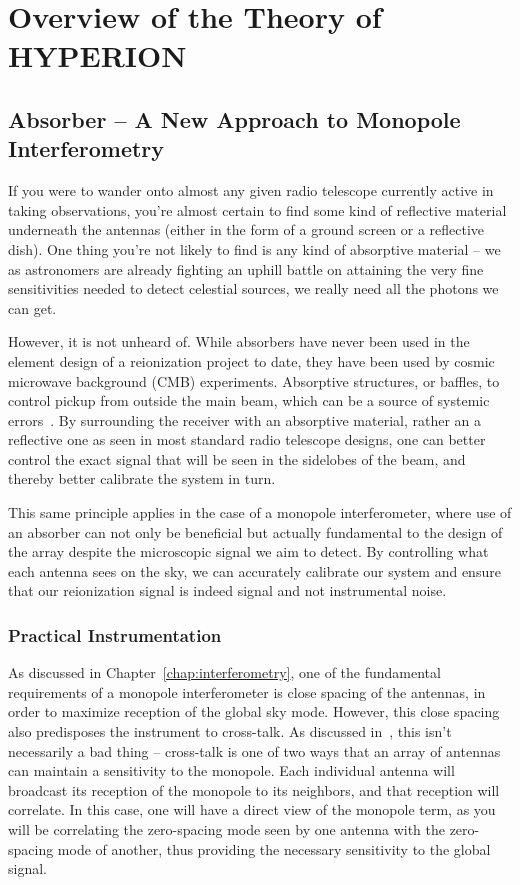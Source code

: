 \chapter{Overview of the Theory of HYPERION}

\section{Absorber -- A New Approach to Monopole Interferometry}

If you were to wander onto almost any given radio telescope currently active in 
taking observations, you're almost certain to find some kind of reflective 
material underneath the antennas (either in the form of a ground screen or a 
reflective dish). One thing you're not likely to find is any kind of absorptive 
material -- we as astronomers are already fighting an uphill battle on 
attaining the very fine sensitivities needed to detect celestial sources, we 
really need all the photons we can get. 

However, it is not unheard of. While absorbers have never been used in the 
element design of a reionization project to date, they have been used by cosmic 
microwave background (CMB) experiments. Absorptive structures, or baffles, to 
control pickup from outside the main beam, which can be a source of systemic 
errors~\citet{essinger-hileman2016}. By surrounding the receiver with an 
absorptive material, rather an a reflective one as seen in most standard radio 
telescope designs, one can better control the exact signal that will be seen in 
the sidelobes of the beam, and thereby better calibrate the system in turn.

This same principle applies in the case of a monopole interferometer, where use 
of an absorber can not only be beneficial but actually fundamental to the 
design of the array despite the microscopic signal we aim to detect. By 
controlling what each antenna sees on the sky, we can accurately calibrate our 
system and ensure that our reionization signal is indeed signal and not 
instrumental noise. 

\subsection{Practical Instrumentation}

As discussed in Chapter~\ref{chap:interferometry}, one of the fundamental 
requirements of a monopole interferometer is close spacing of the antennas, in 
order to maximize reception of the global sky mode. However, this close spacing 
also predisposes the instrument to cross-talk. As discussed 
in~\citet{venumadhav2016}, this isn't necessarily a bad thing -- cross-talk is 
one of two ways that an array of antennas can maintain a sensitivity to the 
monopole. Each individual antenna will broadcast its reception of the monopole 
to its neighbors, and that reception will correlate. In this case, one will 
have a direct view of the monopole term, as you will be correlating the 
zero-spacing mode seen by one antenna with the zero-spacing mode of another, 
thus providing the necessary sensitivity to the global signal. 

